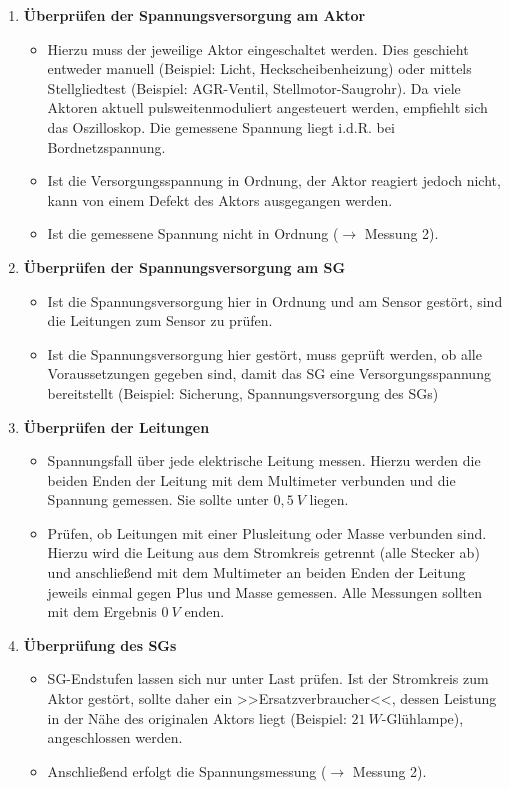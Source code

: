 \begin{enumerate}
\item
  \textbf{Überprüfen der Spannungsversorgung am Aktor}

  \begin{itemize}
  \item
    Hierzu muss der jeweilige Aktor eingeschaltet werden. Dies geschieht
    entweder manuell (Beispiel: Licht, Heckscheibenheizung) oder mittels
    Stellgliedtest (Beispiel: AGR-Ventil, Stellmotor-Saugrohr). Da viele
    Aktoren aktuell pulsweitenmoduliert angesteuert werden, empfiehlt
    sich das Oszilloskop. Die gemessene Spannung liegt i.d.R. bei
    Bordnetzspannung.
  \item
    Ist die Versorgungsspannung in Ordnung, der Aktor reagiert jedoch
    nicht, kann von einem Defekt des Aktors ausgegangen werden.
  \item
    Ist die gemessene Spannung nicht in Ordnung ($\to$ Messung 2).
  \end{itemize}
\item
  \textbf{Überprüfen der Spannungsversorgung am SG}

  \begin{itemize}
  \item
    Ist die Spannungsversorgung hier in Ordnung und am Sensor gestört,
    sind die Leitungen zum Sensor zu prüfen.
  \item
    Ist die Spannungsversorgung hier gestört, muss geprüft werden, ob
    alle Voraussetzungen gegeben sind, damit das SG eine
    Versorgungsspannung bereitstellt (Beispiel: Sicherung,
    Spannungsversorgung des SGs)
  \end{itemize}
\item
  \textbf{Überprüfen der Leitungen}

  \begin{itemize}
  \item
    Spannungsfall über jede elektrische Leitung messen. Hierzu werden
    die beiden Enden der Leitung mit dem Multimeter verbunden und die
    Spannung gemessen. Sie sollte unter $0,5~V$ liegen.
  \item
    Prüfen, ob Leitungen mit einer Plusleitung oder Masse verbunden
    sind. Hierzu wird die Leitung aus dem Stromkreis getrennt (alle
    Stecker ab) und anschließend mit dem Multimeter an beiden Enden der
    Leitung jeweils einmal gegen Plus und Masse gemessen. Alle Messungen
    sollten mit dem Ergebnis $0~V$ enden.
  \end{itemize}
\item
  \textbf{Überprüfung des SGs}

  \begin{itemize}
  \item
    SG-Endstufen lassen sich nur unter Last prüfen. Ist der Stromkreis
    zum Aktor gestört, sollte daher ein >>Ersatzverbraucher<<, dessen
    Leistung in der Nähe des originalen Aktors liegt (Beispiel:
    $21~W$-Glühlampe), angeschlossen werden.
  \item
    Anschließend erfolgt die Spannungsmessung ($\to$ Messung 2).
  \end{itemize}
\end{enumerate}
